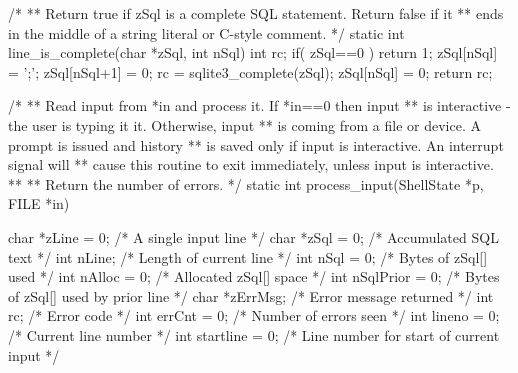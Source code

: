 \begin{Codex}[label=shell.c,numbers=left]
/*
** Return true if zSql is a complete SQL statement.  Return false if it
** ends in the middle of a string literal or C-style comment.
*/
static int line_is_complete(char *zSql, int nSql){
  int rc;
  if( zSql==0 ) return 1;
  zSql[nSql] = ';';
  zSql[nSql+1] = 0;
  rc = sqlite3_complete(zSql);
  zSql[nSql] = 0;
  return rc;
}

/*
** Read input from *in and process it.  If *in==0 then input
** is interactive - the user is typing it it.  Otherwise, input
** is coming from a file or device.  A prompt is issued and history
** is saved only if input is interactive.  An interrupt signal will
** cause this routine to exit immediately, unless input is interactive.
**
** Return the number of errors.
*/
static int process_input(ShellState *p, FILE *in){
  char *zLine = 0;          /* A single input line */
  char *zSql = 0;           /* Accumulated SQL text */
  int nLine;                /* Length of current line */
  int nSql = 0;             /* Bytes of zSql[] used */
  int nAlloc = 0;           /* Allocated zSql[] space */
  int nSqlPrior = 0;        /* Bytes of zSql[] used by prior line */
  char *zErrMsg;            /* Error message returned */
  int rc;                   /* Error code */
  int errCnt = 0;           /* Number of errors seen */
  int lineno = 0;           /* Current line number */
  int startline = 0;        /* Line number for start of current input */

}
\end{Codex}
